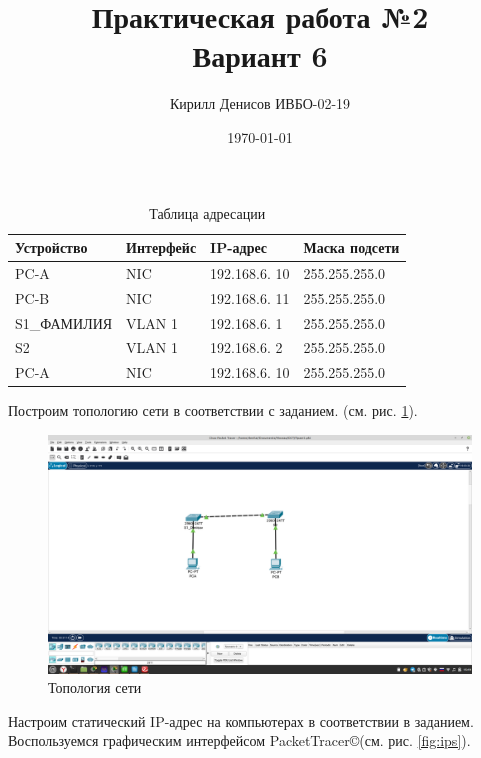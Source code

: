\documentclass[a4paper,14pt]{extarticle}
\author{Кирилл Денисов ИВБО-02-19}
\title{Практическая работа №2\\Вариант 6}
\date{\today}
\newcommand{\pathToCommonFolder}{/home/denilai/Documents/repos/latex/Common}
\newcommand{\pt}{PacketTracer\copyright}
\begin{document}
	\newpage
	\newpage
\maketitle

\begin{table}[htbp]
\begin{center}
		\caption{Таблица адресации}
	\begin{tabular}{|l|l|l|l|}
		\hline
		Устройство  & Интерфейс & IP-адрес & Маска подсети \\ \hline
		PC-A & NIC & 192.168.6. 10 & 255.255.255.0 \\ \hline
		PC-B & NIC & 192.168.6. 11 & 255.255.255.0 \\ \hline
		S1\_ФАМИЛИЯ & VLAN 1 & 192.168.6. 1 & 255.255.255.0 \\ \hline
		S2 & VLAN 1 & 192.168.6. 2 & 255.255.255.0 \\ \hline
		PC-A & NIC & 192.168.6. 10 & 255.255.255.0 \\ \hline
	\end{tabular}
	\label{tab:adress}
\end{center}
\end{table}

Построим топологию сети в соответствии с заданием. (см. рис. \ref{fig:topology}).
\begin{figure}[h!]
	\centering
	\includegraphics[width=0.7\linewidth]{images/topology}
	\caption{Топология сети}
	\label{fig:topology}
\end{figure}

Настроим статический IP-адрес на компьютерах в соответствии в заданием. Воспользуемся графическим интерфейсом \pt (см. рис. \ref{fig:ips}).
\end{document}
